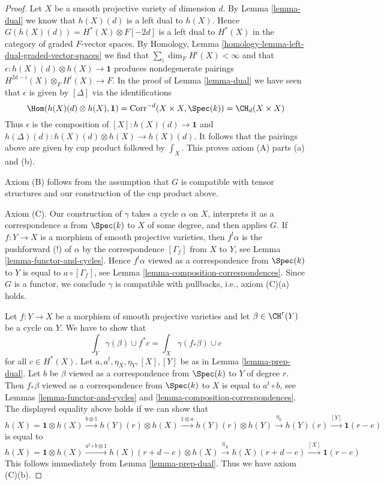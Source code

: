 \begin{proof}
\medskip\noindent
Let $X$ be a smooth projective variety of dimension $d$.
By Lemma \ref{lemma-dual}
we know that $h(X)(d)$ is a left dual to $h(X)$. Hence
$G(h(X)(d)) = H^*(X) \otimes F[-2d]$ is a left dual to
$H^*(X)$ in the category of graded $F$-vector spaces.
By Homology, Lemma \ref{homology-lemma-left-dual-graded-vector-spaces}
we find that $\sum_i \dim_F H^i(X) < \infty$ and that
$\epsilon : h(X)(d) \otimes h(X) \to \mathbf{1}$ produces
nondegenerate pairings $H^{2d - i}(X) \otimes_F H^i(X) \to F$.
In the proof of Lemma \ref{lemma-dual} we have seen that
$\epsilon$ is given by $[\Delta]$ via the identifications
$$
\Hom(h(X)(d) \otimes h(X), \mathbf{1}) =
\text{Corr}^{-d}(X \times X, \Spec(k)) =
\CH_d(X \times X)
$$
Thus $\epsilon$ is the composition of $[X] : h(X)(d) \to \mathbf{1}$
and $h(\Delta)(d) : h(X)(d) \otimes h(X) \to h(X)(d)$. It follows
that the pairings above are given by cup product followed by
$\int_X$. This proves axiom (A) parts (a) and (b).

\medskip\noindent
Axiom (B) follows from the assumption that $G$ is compatible
with tensor structures and our construction of the cup product above.

\medskip\noindent
Axiom (C). Our construction of $\gamma$ takes a cycle $\alpha$ on $X$,
interprets it as a correspondence $a$ from $\Spec(k)$ to $X$ of some degree,
and then applies $G$. If $f : Y \to X$ is a morphism of smooth projective
varieties, then $f^!\alpha$ is the pushforward (!) of $\alpha$
by the correspondence $[\Gamma_f]$ from $X$ to $Y$, see
Lemma \ref{lemma-functor-and-cycles}. Hence
$f^!\alpha$ viewed as a correspondence from $\Spec(k)$ to $Y$
is equal to $a \circ [\Gamma_f]$, see
Lemma \ref{lemma-composition-correspondences}.
Since $G$ is a functor, we conclude
$\gamma$ is compatible with pullbacks, i.e., axiom (C)(a) holds.

\medskip\noindent
Let $f : Y \to X$ be a morphism of smooth projective varieties and
let $\beta \in \CH^r(Y)$ be a cycle on $Y$. We have to show that
$$
\int_Y \gamma(\beta) \cup f^*c = \int_X \gamma(f_*\beta) \cup c
$$
for all $c \in H^*(X)$. Let $a, a^t, \eta_X, \eta_Y, [X], [Y]$
be as in Lemma \ref{lemma-prep-dual}.
Let $b$ be $\beta$ viewed as a correspondence from $\Spec(k)$ to $Y$
of degree $r$. Then $f_*\beta$ viewed as a correspondence from
$\Spec(k)$ to $X$ is equal to $a^t \circ b$, see
Lemmas \ref{lemma-functor-and-cycles} and
\ref{lemma-composition-correspondences}.
The displayed equality above holds if we can show that
$$
h(X) = \mathbf{1} \otimes h(X)
\xrightarrow{b \otimes 1}
h(Y)(r) \otimes h(X)
\xrightarrow{1 \otimes a}
h(Y)(r) \otimes h(Y)
\xrightarrow{\eta_Y}
h(Y)(r)
\xrightarrow{[Y]}
\mathbf{1}(r - e)
$$
is equal to
$$
h(X) = \mathbf{1} \otimes h(X)
\xrightarrow{a^t \circ b \otimes 1}
h(X)(r + d - e) \otimes h(X)
\xrightarrow{\eta_X}
h(X)(r + d - e)
\xrightarrow{[X]}
\mathbf{1}(r - e)
$$
This follows immediately from Lemma \ref{lemma-prep-dual}.
Thus we have axiom (C)(b).


\end{proof}
